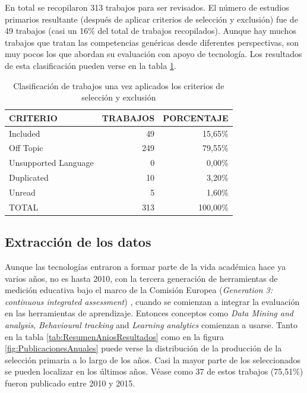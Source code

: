 En total se recopilaron 313 trabajos para ser revisados. El número de estudios primarios resultante (después de aplicar criterios de selección y exclusión) fue de 49 trabajos (casi un 16\% del total de trabajos recopilados). Aunque hay muchos trabajos que tratan las competencias genéricas desde diferentes perspectivas, son muy pocos los que abordan su evaluación con apoyo de tecnología. Los resultados de esta clasificación pueden verse en la tabla \ref{tab:ResumenSelecccionResultados}.

\begin{table}
  \begin{center}
  \begin{tabular}{| m{4cm} | r | r |}
    \hline
    CRITERIO & TRABAJOS & PORCENTAJE\\
    \hline
    \hline 
    Included & 49 & 15,65\% \\
    \hline
    Off Topic & 249 & 79,55\% \\
    \hline
    Unsupported Language & 0 & 0,00\% \\
    \hline
    Duplicated & 10 & 3,20\% \\
    \hline
    Unread & 5 & 1,60\% \\
    \hline
    TOTAL & 313 & 100,00\% \\
    \hline
  \end{tabular}
\end{center}
\caption{Clasificación de trabajos una vez aplicados los criterios de selección y exclusión}
\label{tab:ResumenSelecccionResultados}
\end{table} 

\subsection{Extracción de los datos}

Aunque las tecnologías entraron a formar parte de la vida académica hace ya varios años, no es hasta 2010, con la tercera generación de herramientas de medición educativa bajo el marco de la Comisión Europea (\emph{Generation 3: continuous integrated assessment}) \cite{Redecker:2013}, cuando se comienzan a integrar la evaluación en las herramientas de aprendizaje. Entonces conceptos como \emph{Data Mining and analysis}, \emph{Behavioural tracking} and \emph{Learning analytics} comienzan a usarse. Tanto en la tabla \ref{tab:ResumenAniosResultados} como en la figura \ref{fig:PublicacionesAnuales} puede verse la distribución de la producción de la selección primaria a lo largo de los años. Casi la mayor parte de los seleccionados se pueden localizar en los últimos años. Véase como 37 de estos trabajos (75,51\%) fueron publicado entre 2010 y 2015.

